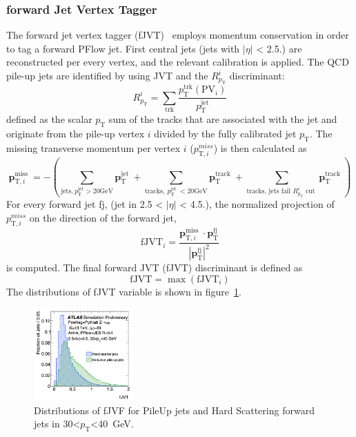 \subsubsection{forward Jet Vertex Tagger}
The forward jet vertex tagger (fJVT)~\cite{PERF-2016-06} employs momentum conservation in order to tag a forward PFlow jet.
First central jets (jets with $|\eta|$ < 2.5.) are reconstructed per every vertex, and the relevant calibration is applied. 
The QCD pile-up jets are identified by using JVT and the $R^i_{p_\mathrm{T}}$ discriminant:
\begin{equation}
R_{p_{\mathrm{T}}}^i=\sum_{\mathrm{trk}} \frac{p_{\mathrm{T}}^{\mathrm{trk}}\left(\mathrm{PV}_i\right)}{p_{\mathrm{T}}^{\mathrm{jet}}}
\end{equation}
defined as the scalar $p_\mathrm{T}$ sum of the tracks that are associated with the jet and originate from the pile-up vertex $i$ divided by the fully calibrated jet $p_\mathrm{T}$. 
The missing transverse momentum per vertex $i$ ($p^{miss}_{\mathrm{T},i}$) is then calculated as
\begin{equation}
\mathbf{p}_{\mathrm{T}, i}^{\text {miss }}=-\left(\sum_{\text{jets,}{~p_{\mathrm{T}}^{\text{jet}}>20\mathrm{GeV}}} \mathbf{p}_{\mathrm{T}}^{\text {jet }}+\sum_{\text {tracks},~p_{\mathrm{T}}^{\text {jet }}<20 \mathrm{GeV}} \mathbf{p}_{\mathrm{T}}^{\text {track }}+\sum_{\text {tracks, jets fail } R_{p_{\mathrm{T}}}^i \text { cut }} \mathbf{p}_{\mathrm{T}}^{\text {track }}\right)
\end{equation}
For every forward jet fj, (jet in 2.5 < $|\eta|$ < 4.5.), the normalized projection of $p^{miss}_{\mathrm{T},i}$ on the direction of the forward jet,
\begin{equation}
\mathrm{fJVT}_i=\frac{\mathbf{p}_{\mathrm{T}, i}^{\text {miss }} \cdot \mathbf{p}_{\mathrm{T}}^{\mathrm{fj}}}{\left|\mathbf{p}_{\mathrm{T}}^{\mathrm{fj}}\right|^2}
\end{equation}
is computed. The final forward JVT (fJVT) discriminant is defined as
\begin{equation}
\mathrm{fJVT}=\max \left(\mathrm{fJVT}_i\right)
\end{equation}
The distributions of fJVT variable is shown in figure~\ref{fig:fJVT}. 
\begin{figure}[tbp]
    \begin{center}
    \includegraphics[width=0.34\textwidth,keepaspectratio]{figures/Reconstruction/fJVT}
    \caption{
    Distributions of fJVF for PileUp jets and Hard Scattering forward jets in 30<$p_\mathrm{T}$<40~GeV. \cite{PERF-2016-06}
    }
    \label{fig:fJVT}
    \end{center}
\end{figure}
